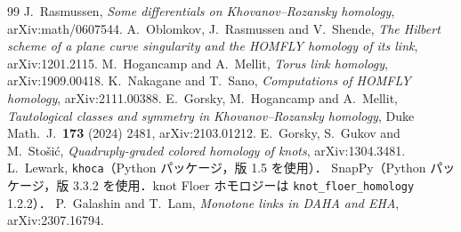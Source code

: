 \documentclass[11pt,a4paper]{ltjsarticle}
\theoremstyle{definition}
\theoremstyle{remark}
\begin{document}
\begin{thebibliography}{99}
 J.~Rasmussen, \emph{Some differentials on Khovanov--Rozansky homology}, arXiv:math/0607544.
 A.~Oblomkov, J.~Rasmussen and V.~Shende, \emph{The Hilbert scheme of a plane curve singularity and the HOMFLY homology of its link}, arXiv:1201.2115.
 M.~Hogancamp and A.~Mellit, \emph{Torus link homology}, arXiv:1909.00418.
 K.~Nakagane and T.~Sano, \emph{Computations of HOMFLY homology}, arXiv:2111.00388.
 E.~Gorsky, M.~Hogancamp and A.~Mellit, \emph{Tautological classes and symmetry in Khovanov--Rozansky homology}, Duke Math.~J.\ \textbf{173} (2024) 2481, arXiv:2103.01212.
 E.~Gorsky, S.~Gukov and M.~Stošić, \emph{Quadruply-graded colored homology of knots}, arXiv:1304.3481.
 L.~Lewark, \texttt{khoca}（Python パッケージ，版 1.5 を使用）．
 SnapPy（Python パッケージ，版 3.3.2 を使用．knot Floer ホモロジーは \texttt{knot\_floer\_homology} 1.2.2）．
 P.~Galashin and T.~Lam, \emph{Monotone links in DAHA and EHA}, arXiv:2307.16794.
\end{thebibliography}
\end{document}
